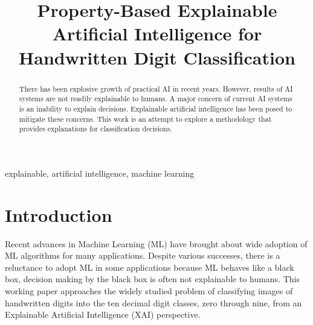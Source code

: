 \documentclass[conference]{IEEEtran}
\begin{document}
\title{Property-Based Explainable Artificial Intelligence for Handwritten Digit Classification}

\author{
\and
{}
\and
{}

}

\maketitle

\begin{abstract}
There has been explosive growth of practical AI in recent years.
However, results of AI systems are not readily explainable to humans.
A major concern of current AI systems is an inability to explain decisions.
Explainable artificial intelligence has been posed to mitigate these concerns.
This work is an attempt to explore a methodology that provides explanations
for classification decisions.
\end{abstract}

\begin{IEEEkeywords}
explainable, artificial intelligence, machine learning
\end{IEEEkeywords}

\section{Introduction}

Recent advances in Machine Learning (ML) have brought about wide adoption of ML algorithms for many applications.  Despite various successes, there is a reluctance to adopt ML in some applications because ML behaves like a black box, decision making by the black box is often not explainable to humans.  This working paper approaches the widely studied problem of classifying images of handwritten digits into the ten decimal digit classes, zero through nine, from an Explainable Artificial Intelligence (XAI) perspective.
\end{document}
